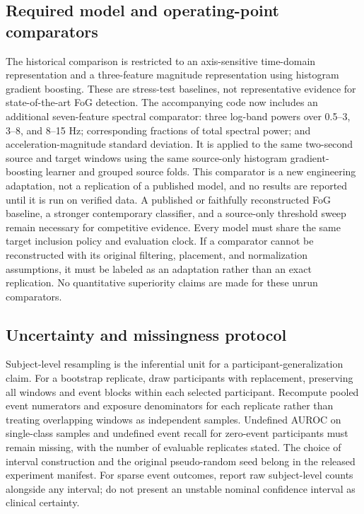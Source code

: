 \documentclass[sigconf,review,anonymous]{acmart}
\begin{document}
\subsection{Required model and operating-point comparators}
The historical comparison is restricted to an axis-sensitive time-domain representation and a three-feature magnitude representation using histogram gradient boosting. These are stress-test baselines, not representative evidence for state-of-the-art FoG detection. The accompanying code now includes an additional seven-feature spectral comparator: three log-band powers over 0.5--3, 3--8, and 8--15 Hz; corresponding fractions of total spectral power; and acceleration-magnitude standard deviation. It is applied to the same two-second source and target windows using the same source-only histogram gradient-boosting learner and grouped source folds. This comparator is a new engineering adaptation, not a replication of a published model, and no results are reported until it is run on verified data. A published or faithfully reconstructed FoG baseline, a stronger contemporary classifier, and a source-only threshold sweep remain necessary for competitive evidence. Every model must share the same target inclusion policy and evaluation clock. If a comparator cannot be reconstructed with its original filtering, placement, and normalization assumptions, it must be labeled as an adaptation rather than an exact replication. No quantitative superiority claims are made for these unrun comparators.

\subsection{Uncertainty and missingness protocol}
Subject-level resampling is the inferential unit for a participant-generalization claim. For a bootstrap replicate, draw participants with replacement, preserving all windows and event blocks within each selected participant. Recompute pooled event numerators and exposure denominators for each replicate rather than treating overlapping windows as independent samples. Undefined AUROC on single-class samples and undefined event recall for zero-event participants must remain missing, with the number of evaluable replicates stated. The choice of interval construction and the original pseudo-random seed belong in the released experiment manifest. For sparse event outcomes, report raw subject-level counts alongside any interval; do not present an unstable nominal confidence interval as clinical certainty.
\end{document}
